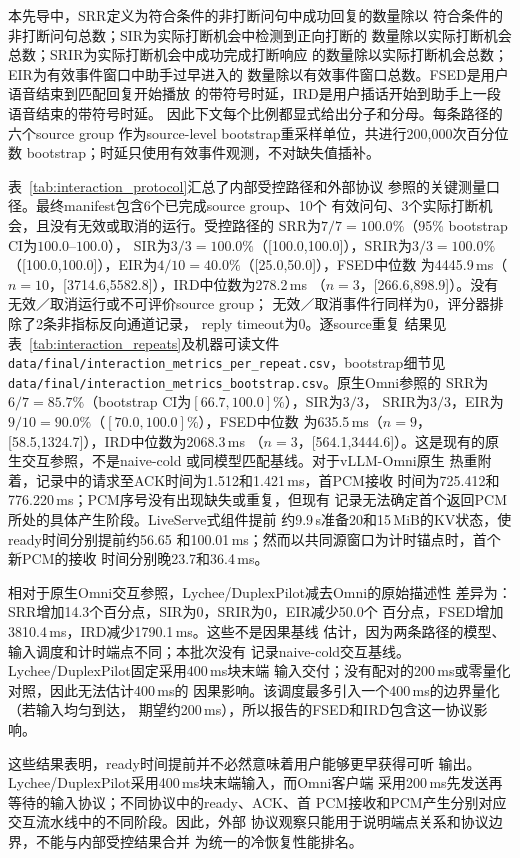\documentclass{article}
\begin{document}
本先导中，SRR定义为符合条件的非打断问句中成功回复的数量除以
符合条件的非打断问句总数；SIR为实际打断机会中检测到正向打断的
数量除以实际打断机会总数；SRIR为实际打断机会中成功完成打断响应
的数量除以实际打断机会总数；EIR为有效事件窗口中助手过早进入的
数量除以有效事件窗口总数。FSED是用户语音结束到匹配回复开始播放
的带符号时延，IRD是用户插话开始到助手上一段语音结束的带符号时延。
因此下文每个比例都显式给出分子和分母。每条路径的六个source group
作为source-level bootstrap重采样单位，共进行200,000次百分位数
bootstrap；时延只使用有效事件观测，不对缺失值插补。

表~\ref{tab:interaction_protocol}汇总了内部受控路径和外部协议
参照的关键测量口径。最终manifest包含6个已完成source group、10个
有效问句、3个实际打断机会，且没有无效或取消的运行。受控路径的
SRR为$7/7=100.0\%$（95\% bootstrap CI为$100.0$--$100.0$），
SIR为$3/3=100.0\%$（[100.0,100.0]），SRIR为$3/3=100.0\%$
（[100.0,100.0]），EIR为$4/10=40.0\%$（[25.0,50.0]），FSED中位数
为4445.9\,ms（$n=10$，[3714.6,5582.8]），IRD中位数为278.2\,ms
（$n=3$，[266.6,898.9]）。没有无效／取消运行或不可评价source group；
无效／取消事件行同样为0，评分器排除了2条非指标反向通道记录，
reply timeout为0。逐source重复
结果见表~\ref{tab:interaction_repeats}及机器可读文件
\texttt{data/final/interaction\_metrics\_per\_repeat.csv}，bootstrap细节见
\texttt{data/final/interaction\_metrics\_bootstrap.csv}。原生Omni参照的
SRR为$6/7=85.7\%$（bootstrap CI为$[66.7,100.0]\%$），SIR为$3/3$，
SRIR为$3/3$，EIR为$9/10=90.0\%$（$[70.0,100.0]\%$），FSED中位数
为635.5\,ms（$n=9$，[58.5,1324.7]），IRD中位数为2068.3\,ms
（$n=3$，[564.1,3444.6]）。这是现有的原生交互参照，不是naive-cold
或同模型匹配基线。对于vLLM-Omni原生
热重附着，记录中的请求至ACK时间为1.512和1.421\,ms，首PCM接收
时间为725.412和776.220\,ms；PCM序号没有出现缺失或重复，但现有
记录无法确定首个返回PCM所处的具体产生阶段。LiveServe式组件提前
约9.9\,s准备20和15\,MiB的KV状态，使ready时间分别提前约56.65
和100.01\,ms；然而以共同源窗口为计时锚点时，首个新PCM的接收
时间分别晚23.7和36.4\,ms。

相对于原生Omni交互参照，Lychee/DuplexPilot减去Omni的原始描述性
差异为：SRR增加14.3个百分点，SIR为0，SRIR为0，EIR减少50.0个
百分点，FSED增加3810.4\,ms，IRD减少1790.1\,ms。这些不是因果基线
估计，因为两条路径的模型、输入调度和计时端点不同；本批次没有
记录naive-cold交互基线。Lychee/DuplexPilot固定采用400\,ms块末端
输入交付；没有配对的200\,ms或零量化对照，因此无法估计400\,ms的
因果影响。该调度最多引入一个400\,ms的边界量化（若输入均匀到达，
期望约200\,ms），所以报告的FSED和IRD包含这一协议影响。

这些结果表明，ready时间提前并不必然意味着用户能够更早获得可听
输出。Lychee/DuplexPilot采用400\,ms块末端输入，而Omni客户端
采用200\,ms先发送再等待的输入协议；不同协议中的ready、ACK、首
PCM接收和PCM产生分别对应交互流水线中的不同阶段。因此，外部
协议观察只能用于说明端点关系和协议边界，不能与内部受控结果合并
为统一的冷恢复性能排名。
\end{document}
